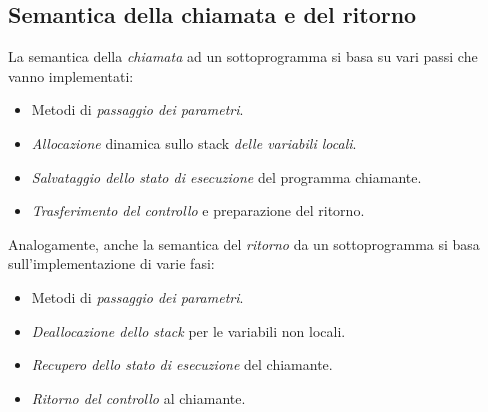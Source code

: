 \documentclass[a4paper,oneside,titlepage]{book}
\begin{document}
\subsection{Semantica della chiamata e del ritorno}
La semantica della \textit{chiamata} ad un sottoprogramma si basa su vari passi che vanno implementati:
\begin{itemize}
	\item Metodi di \textit{passaggio dei parametri}.
	\item \textit{Allocazione} dinamica sullo stack \textit{delle variabili locali}.
	\item \textit{Salvataggio dello stato di esecuzione} del programma chiamante.
	\item \textit{Trasferimento del controllo} e preparazione del ritorno.
\end{itemize}
Analogamente, anche la semantica del \textit{ritorno} da un sottoprogramma si basa sull'implementazione di varie fasi:
\begin{itemize}
	\item Metodi di \textit{passaggio dei parametri}.
	\item \textit{Deallocazione dello stack} per le variabili non locali.
	\item \textit{Recupero dello stato di esecuzione} del chiamante.
	\item \textit{Ritorno del controllo} al chiamante.
\end{itemize}
\end{document}
